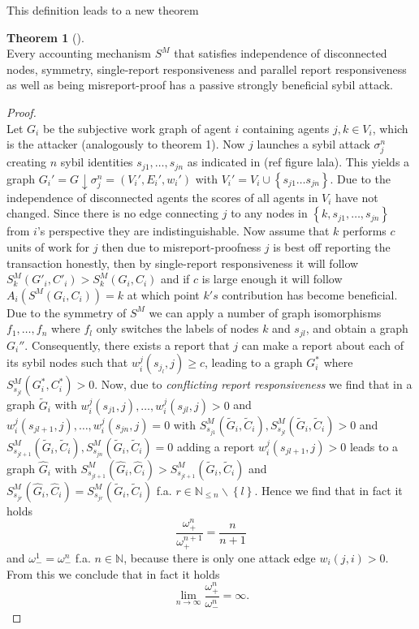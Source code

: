 \documentclass[11pt,a4paper]{article}
\theoremstyle{definition}
\theoremstyle{theorem}
\newtheorem{theorem}{Theorem}[section]
\theoremstyle{proposition}
\theoremstyle{corollary}
\theoremstyle{lemma}
\theoremstyle{example}
\theoremstyle{remark}
\begin{document}
This definition leads to a new theorem
\begin{theorem}[]\ \\
Every accounting mechanism $S^M$ that satisfies independence of disconnected nodes, symmetry, single-report responsiveness and parallel report responsiveness as well as being misreport-proof has a passive strongly beneficial sybil attack. 
\end{theorem}
\begin{proof}\ \\
Let $G_i$ be the subjective work graph of agent $i$ containing agents $j,k\in{}V_i$, which is the attacker (analogously to theorem 1). Now $j$ launches a sybil attack $\sigma_j^n$ creating $n$ sybil identities $s_{j1},\ldots,s_{jn}$ as indicated in (ref figure lala). This yields a graph $G_i'=G\downarrow\sigma^n_j=(V_i',E_i',w_i')$ with $V_i'=V_i\cup\left\lbrace{}s_{j1}\ldots{}s_{jn}\right\rbrace$. Due to the independence of disconnected agents the scores of all agents in $V_i$ have not changed. Since there is no edge connecting $j$ to any nodes in $\left\lbrace{}k,s_{j1},\ldots,s_{jn}\right\rbrace$ from $i$'s perspective they are indistinguishable. Now assume that $k$ performs $c$ units of work for $j$ then due to misreport-proofness $j$ is best off reporting the transaction honestly, then by single-report responsiveness it will follow $S^M_k(G'_i,C'_i)>S^M_k(G_i,C_i)$ and if $c$ is large enough it will follow $A_i(S^M(G_i,C_i))=k$ at which point $k's$ contribution has become beneficial. Due to the symmetry of $S^M$ we can apply a number of graph isomorphisms $f_1,\ldots,f_n$ where $f_l$ only switches the labels of nodes $k$ and $s_{jl}$, and obtain a graph $G_i''$. Consequently, there exists a report that $j$ can make a report about each of its sybil nodes such that $w_i^j(s_{j_l},j)\geq{}c$, leading to a graph $G_i^{*}$ where $S^M_{s_{jl}}(G_i^{*},C_i^{*})>0$. Now, due to {\it conflicting report responsiveness} we find that in a graph $\tilde{G}_i$ with $w_i^j(s_{j1},j),\ldots,w_i^j(s_{jl},j)>0$ and $w_i^j(s_{jl+1},j),\ldots,w_i^j(s_{jn},j)=0$ with $S^M_{s_{j1}}(\tilde{G}_i,\tilde{C}_i),S^M_{s_{jl}}(\tilde{G}_i,\tilde{C}_i)>0$ and $S^M_{s_{jl+1}}(\tilde{G}_i,\tilde{C}_i),S^M_{s_{jn}}(\tilde{G}_i,\tilde{C}_i)=0$ adding a report $w_i^j(s_{jl+1},j)>0$ leads to a graph $\hat{G}_i$ with $S^M_{s_{jl+1}}(\hat{G}_i,\hat{C}_i)>S^M_{s_{jl+1}}(\tilde{G}_i,\tilde{C}_i)$ and $S^M_{s_{jr}}(\hat{G}_i,\hat{C}_i)=S^M_{s_{jr}}(\tilde{G}_i,\tilde{C}_i)$ f.a. $r\in\mathbb{N}_{\leq{}n}\backslash\left\lbrace{}l\right\rbrace$. Hence we find that in fact it holds
\[
\frac{\omega_{+}^n}{\omega_{+}^{n+1}}=\frac{n}{n+1}
\]
and $\omega_{-}^1=\omega_{-}^n$ f.a. $n\in\mathbb{N}$, because there is only one attack edge $w_i(j,i)>0$. From this we conclude that in fact it holds
\[
\lim\limits_{n\rightarrow\infty}\frac{\omega^n_{+}}{\omega^n_{-}}=\infty.
\]
\end{proof}
\end{document}
